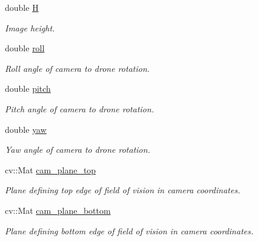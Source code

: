 \begin{DoxyCompactItemize}
double \hyperlink{structCamera_a08b26416f7b00171c4a4e301ab33ee64}{H}
\begin{DoxyCompactList}\small\item\em Image height. \end{DoxyCompactList}\item 
\mbox{\label{structCamera_a4159be1fbc48e36fddf6720475450a0c}} 
double \hyperlink{structCamera_a4159be1fbc48e36fddf6720475450a0c}{roll}
\begin{DoxyCompactList}\small\item\em Roll angle of camera to drone rotation. \end{DoxyCompactList}\item 
\mbox{\label{structCamera_a481e669a6f96826929e323706543a6a4}} 
double \hyperlink{structCamera_a481e669a6f96826929e323706543a6a4}{pitch}
\begin{DoxyCompactList}\small\item\em Pitch angle of camera to drone rotation. \end{DoxyCompactList}\item 
\mbox{\label{structCamera_a54536224732656e8f4a419cf11662d3e}} 
double \hyperlink{structCamera_a54536224732656e8f4a419cf11662d3e}{yaw}
\begin{DoxyCompactList}\small\item\em Yaw angle of camera to drone rotation. \end{DoxyCompactList}\item 
\mbox{\label{structCamera_a60b9f85205ff2ec338a9d25031401f04}} 
cv\+::\+Mat \hyperlink{structCamera_a60b9f85205ff2ec338a9d25031401f04}{cam\+\_\+plane\+\_\+top}
\begin{DoxyCompactList}\small\item\em Plane defining top edge of field of vision in camera coordinates. \end{DoxyCompactList}\item 
\mbox{\label{structCamera_a25cec7b31e3bd02d20934e471fa48a3f}} 
cv\+::\+Mat \hyperlink{structCamera_a25cec7b31e3bd02d20934e471fa48a3f}{cam\+\_\+plane\+\_\+bottom}
\begin{DoxyCompactList}\small\item\em Plane defining bottom edge of field of vision in camera coordinates. \end{DoxyCompactList}\item 

\end{DoxyCompactItemize}
